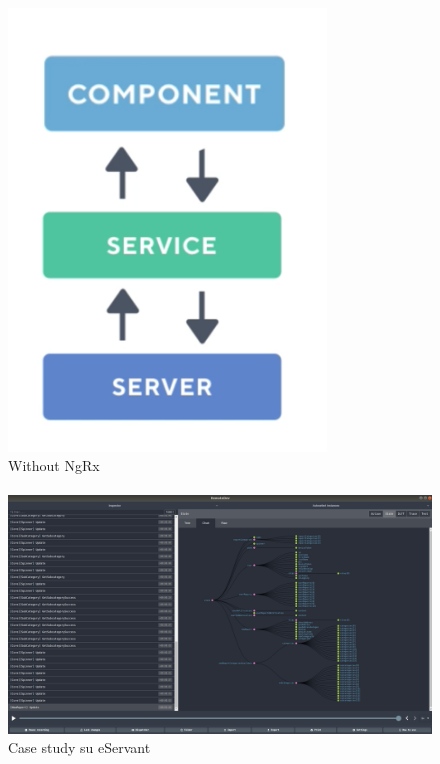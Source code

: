 \paragraph{}

\begin{figure}[h!]
    \caption{Without NgRx}
    \includegraphics[scale=0.5]{img/cap2/without-ngrx}
\end{figure}
\paragraph{}

\begin{figure}[h!]
    \caption{Case study su eServant}
    \includegraphics[scale=0.2]{img/cap2/ngrx-eservant}
\end{figure}

